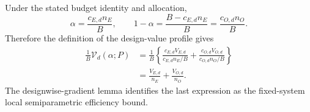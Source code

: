 Under the stated budget identity and allocation,
\[
 \alpha=\frac{c_{E,d}n_E}{B},\qquad
 1-\alpha=\frac{B-c_{E,d}n_E}{B}=\frac{c_{O,d}n_O}{B}.
\]
Therefore the definition of the design-value profile gives
\[
\begin{aligned}
 \frac1B\mathcal V_d(\alpha;P)
 &=\frac1B\left\{
 \frac{c_{E,d}V_{E,d}}{c_{E,d}n_E/B}
 +\frac{c_{O,d}V_{O,d}}{c_{O,d}n_O/B}\right\}\\
 &=\frac{V_{E,d}}{n_E}+\frac{V_{O,d}}{n_O}.
\end{aligned}
\]
The designwise-gradient lemma identifies the last expression as the fixed-system local semiparametric efficiency bound.